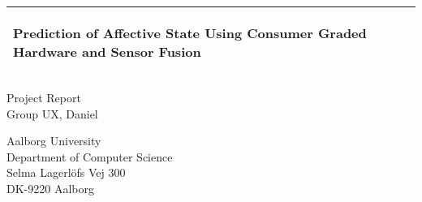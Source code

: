 %
\begin{titlepage}
  \addtolength{\hoffset}{0.5\evensidemargin-0.5\oddsidemargin} %
  \noindent%
  \begin{tabular}{@{}p{\textwidth}@{}}
    \toprule[2pt]
    \midrule
    \vspace{0.2cm}
    \begin{center}
        \Huge{\textbf{%
      Prediction of Affective State Using Consumer Graded Hardware and Sensor Fusion
    }}
    \end{center}
    \begin{center}
      \Large{%
          
      }
    \end{center}
    \vspace{0.2cm}\\
    \midrule
    \toprule[2pt]
  \end{tabular}
  \vspace{4 cm}
  \begin{center}
    {\large
      Project Report%
    }\\
    \vspace{0.2cm}
    {\Large
      Group UX, Daniel%
    }
  \end{center}
  \vfill
  \begin{center}
  Aalborg University\\
  Department of Computer Science\\
  Selma Lagerlöfs Vej 300\\
  DK-9220 Aalborg
  \end{center}
\end{titlepage}
\clearpage
